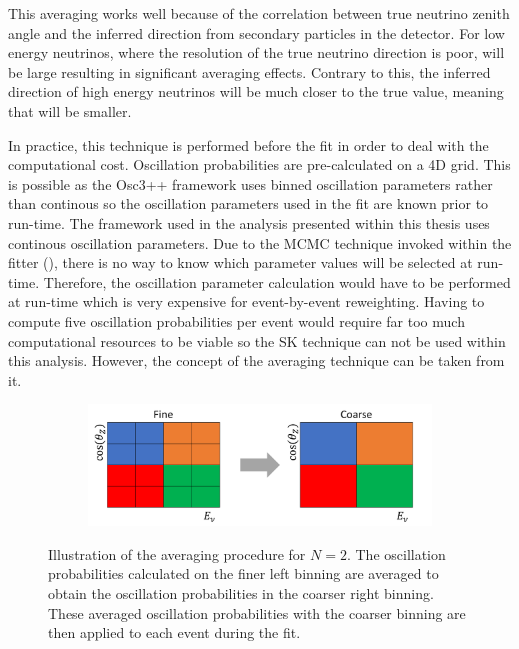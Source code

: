 This averaging works well because of the correlation between true neutrino zenith angle and the inferred direction from secondary particles in the detector. For low energy neutrinos, where the resolution of the true neutrino direction is poor,  will be large resulting in significant averaging effects. Contrary to this, the inferred direction of high energy neutrinos will be much closer to the true value, meaning that  will be smaller.

In practice, this technique is performed before the fit in order to deal with the computational cost. Oscillation probabilities are pre-calculated on a 4D grid. This is possible as the Osc3++ framework uses binned oscillation parameters rather than continous so the oscillation parameters used in the fit are known prior to run-time. The framework used in the analysis presented within this thesis uses continous oscillation parameters. Due to the MCMC technique invoked within the fitter (), there is no way to know which parameter values will be selected at run-time. Therefore, the oscillation parameter calculation would have to be performed at run-time which is very expensive for event-by-event reweighting. Having to compute five oscillation probabilities per event would require far too much computational resources to be viable so the SK technique can not be used within this analysis. However, the concept of the averaging technique can be taken from it.

\begin{figure}[h]
  \begin{subfigure}[t]{\textwidth}
    \includegraphics[width=\textwidth, trim={0mm 0mm 0mm 0mm}, clip,page=1]{Figures/Oscillation/SubSamplingExample.pdf}
  \end{subfigure}
  \caption{Illustration of the averaging procedure for $N=2$. The oscillation probabilities calculated on the finer left binning are averaged to obtain the oscillation probabilities in the coarser right binning. These averaged oscillation probabilities with the coarser binning are then applied to each event during the fit.}
  \label{fig:Oscillation_SK_SubSamplingExample}
\end{figure}

